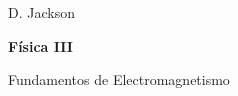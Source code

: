 \begin{flushleft}
  \Large{D. Jackson}\\ \vspace{2cm}
  {\Huge\textbf{Física III}\par}\vspace{1cm}
  \Large{Fundamentos de Electromagnetismo}\\ 
  \vfill
\end{flushleft}
\newpage
